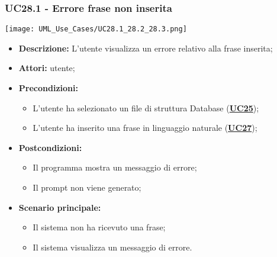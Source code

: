 \subsubsection{UC28.1 - Errore frase non inserita}
\label{sec:UC28.1}
\texttt{[image: UML\_Use\_Cases/UC28.1\_28.2\_28.3.png]}
\begin{itemize}
	\item \textbf{Descrizione:} L’utente visualizza un errore relativo alla frase inserita;
	\item \textbf{Attori:} utente;
	\item \textbf{Precondizioni:} 
	\begin{itemize}
		\item L’utente ha selezionato un file di struttura Database (\hyperref[sec:UC25]{\textbf{UC25}});
		\item L'utente ha inserito una frase in linguaggio naturale (\hyperref[sec:UC27]{\textbf{UC27}});
	\end{itemize}
	\item \textbf{Postcondizioni:} 
	\begin{itemize}
		\item Il programma mostra un messaggio di errore;
		\item Il prompt non viene generato;
	\end{itemize}
	\item \textbf{Scenario principale:} 
	\begin{itemize}
		\item Il sistema non ha ricevuto una frase;
		\item Il sistema visualizza un messaggio di errore.
	\end{itemize}
\end{itemize}


